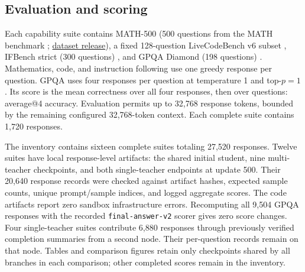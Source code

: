 
\subsection{Evaluation and scoring}

Each capability suite contains MATH-500 (500 questions from the MATH benchmark \citep{hendrycks2021math}; \href{https://huggingface.co/datasets/HuggingFaceH4/MATH-500}{dataset release}), a fixed 128-question LiveCodeBench v6 subset \citep{jain2024livecodebench}, IFBench strict (300 questions) \citep{pyatkin2025ifbench}, and GPQA Diamond (198 questions) \citep{rein2023gpqa}. Mathematics, code, and instruction following use one greedy response per question. GPQA uses four responses per question at temperature 1 and top-$p=1$. Its score is the mean correctness over all four responses, then over questions: average@4 accuracy. Evaluation permits up to 32,768 response tokens, bounded by the remaining configured 32,768-token context. Each complete suite contains 1,720 responses.

The inventory contains sixteen complete suites totaling 27,520 responses. Twelve suites have local response-level artifacts: the shared initial student, nine multi-teacher checkpoints, and both single-teacher endpoints at update 500. Their 20,640 response records were checked against artifact hashes, expected sample counts, unique prompt/sample indices, and logged aggregate scores. The code artifacts report zero sandbox infrastructure errors. Recomputing all 9,504 GPQA responses with the recorded \texttt{final-answer-v2} scorer gives zero score changes. Four single-teacher suites contribute 6,880 responses through previously verified completion summaries from a second node. Their per-question records remain on that node. Tables and comparison figures retain only checkpoints shared by all branches in each comparison; other completed scores remain in the inventory.

\begin{table}[t]
\caption{Capability scores (\%) at complete comparison checkpoints. The initial student is shared. GT/DT/DR use update 50; PG/I64 use common updates within each teacher setting. Scores use all evaluated responses.}
\label{tab:all_capability}
\centering\small

\end{table}

